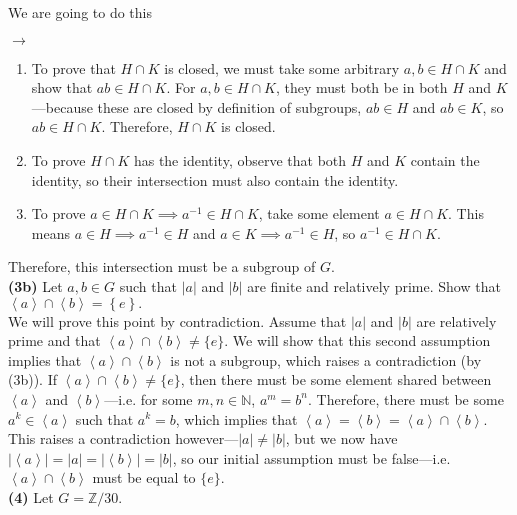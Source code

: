 \documentclass[12pt,letterpaper]{article}
\begin{document}
We are going to do this \begin{Huge}\(\longrightarrow\)\end{Huge}

\begin{enumerate}
	\item To prove that \(H \cap K\) is closed, we must take some arbitrary \(a,b\in H \cap K\) and show that \(ab \in H \cap K\). For \(a,b \in H \cap K\), they must both be in both \(H\) and \(K\)---because these are closed by definition of subgroups, \(ab \in H\) and \(ab \in K\), so \(ab \in H \cap K\). Therefore, \(H \cap K\) is closed.
	\item To prove \(H \cap K\) has the identity, observe that both \(H\) and \(K\) contain the identity, so their intersection must also contain the identity.
	\item To prove \(a \in H \cap K \implies a^{-1} \in H \cap K\), take some element \(a \in H \cap K\). This means \(a \in H \implies a^{-1} \in H\) and \(a \in K \implies a^{-1} \in H\), so \(a^{-1} \in H \cap K\).
\end{enumerate}

Therefore, this intersection must be a subgroup of \(G\). \\

\textbf{(3b)} Let \(a,b \in G\) such that \(|a|\) and \(|b|\) are finite and relatively prime. Show that \(\left<a\right> \cap \left<b\right> = \left\{e\right\}.\) \\

We will prove this point by contradiction. Assume that \(|a|\) and \(|b|\) are relatively prime and that \(\left<a\right> \cap \left<b\right> \neq \{e\}\). We will show that this second assumption implies that \(\left<a\right> \cap \left<b\right>\) is not a subgroup, which raises a contradiction (by (3b)). If \(\left<a\right> \cap \left<b\right>\neq \{e\}\), then there must be some element shared between \(\left<a\right>\) and \(\left<b\right>\)---i.e. for some \(m,n \in \mathbb{N}\), \(a^{m} = b^{n}\). Therefore, there must be some \(a^{k} \in \left<a\right>\) such that \(a^{k} = b\), which implies that \(\left<a\right> = \left<b\right> = \left<a\right> \cap \left<b\right>\). This raises a contradiction however---\(|a|\neq|b|\), but we now have \(|\left<a\right>| = |a| = |\left<b\right> | = |b|\), so our initial assumption must be false---i.e. \(\left<a\right> \cap \left<b\right>\) must be equal to \(\{e\}\). \\

\textbf{(4)} Let \(G = \mathbb{Z}/30\). \\
\end{document}
